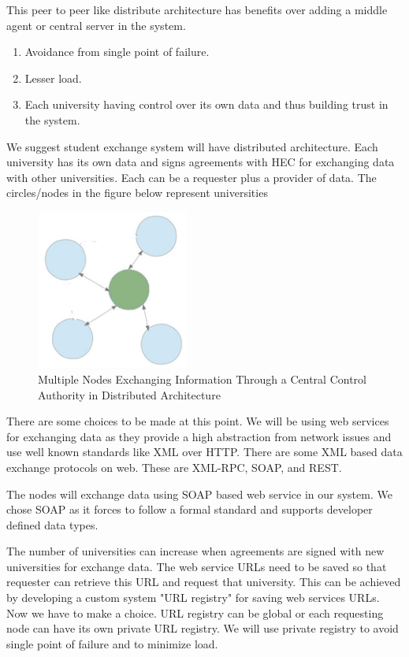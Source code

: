 \documentclass[12pt,a4paper,oneside]{book}
\begin{document}
This peer to peer like distribute architecture has benefits over adding a middle agent or central server in the system.

\begin{enumerate}
\item Avoidance from single point of failure.
\item Lesser load.
\item Each university having control over its own data and thus building trust in the system.	
\end{enumerate}

We suggest student exchange system will have distributed architecture. Each university has its own data and signs agreements with HEC for exchanging data with other universities. Each can be a requester plus a provider of data. The circles/nodes in the figure below represent universities

\begin{figure}[!htp]
  \centering
  \includegraphics[width=5cm]{architecture_distributed_exchange_through_hec.png}
  \caption{Multiple Nodes Exchanging Information Through a Central Control Authority in Distributed Architecture}
  \label{fig:architecture_distributed_exchange_through_hec}
\end{figure}

There are some choices to be made at this point. We will be using web services for exchanging data as they provide a high abstraction from network issues and use well known standards like XML over HTTP. There are some XML based data exchange protocols on web. These are XML-RPC, SOAP, and REST.

The nodes will exchange data using SOAP based web service in our system.  We chose SOAP as it forces to follow a formal standard and supports developer defined data types.

The number of universities can increase when agreements are signed with new universities for exchange data. The web service URLs need to be saved so that requester can retrieve this URL and request that university. This can be achieved by developing a custom system "URL registry" for saving web services URLs. Now we have to make a choice. URL registry can be global or each requesting node can have its own private URL registry. We will use private registry to avoid single point of failure and to minimize load.
\end{document}
